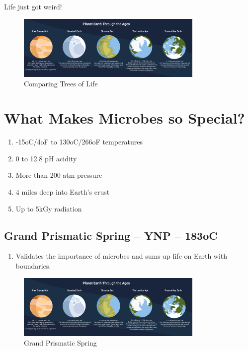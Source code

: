 \documentclass[
]{book}
\providecommand{\tightlist}{%
  \setlength{\itemsep}{0pt}\setlength{\parskip}{0pt}}
\begin{document}
Life just got weird!

\begin{figure}
\centering
\includegraphics[width=0.8\textwidth,height=\textheight]{./Figures/Planets.png}
\caption{Comparing Trees of Life}
\end{figure}

\hypertarget{what-makes-microbes-so-special}{%
\section{What Makes Microbes so Special?}\label{what-makes-microbes-so-special}}

\begin{enumerate}
\def\labelenumi{\arabic{enumi}.}
\tightlist
\item
  -15oC/4oF to 130oC/266oF temperatures
\item
  0 to 12.8 pH acidity
\item
  More than 200 atm pressure
\item
  4 miles deep into Earth's crust
\item
  Up to 5kGy radiation
\end{enumerate}

\hypertarget{grand-prismatic-spring-ynp-183oc}{%
\subsection*{Grand Prismatic Spring -- YNP -- 183oC}\label{grand-prismatic-spring-ynp-183oc}}

\begin{enumerate}
\def\labelenumi{\arabic{enumi}.}
\tightlist
\item
  Validates the importance of microbes and sums up life on Earth with boundaries.
\end{enumerate}

\begin{figure}
\centering
\includegraphics[width=0.8\textwidth,height=\textheight]{./Figures/Planets.png}
\caption{Grand Prismatic Spring}
\end{figure}
\end{document}

